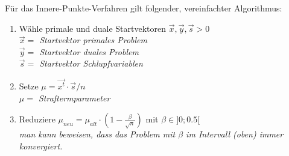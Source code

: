 Für das Innere-Punkte-Verfahren gilt folgender, vereinfachter Algorithmus:
\\	
\begin{enumerate}
\item Wähle primale und duale Startvektoren $\vec{x},\vec{y},\vec{s} > 0$\\
\textit{ $\vec{x} =$ Startvektor primales Problem\\$\vec{y} = $ Startvektor duales Problem\\$\vec{s} =$ Startvektor Schlupfvariablen}\\
\item Setze $\mu = \vec{x^t} \cdot \vec{s}/n$\\
\textit{$\mu =$ Straftermparameter}\\
\item Reduziere $\mu_{neu}=\mu_{alt} \cdot (1-\frac{\beta}{\sqrt{n}})$ mit $\beta \in ]0;0.5[$\\
\textit{man kann beweisen, dass das Problem mit $\beta$ im Intervall (oben) immer konvergiert.}\\


\end{enumerate}
